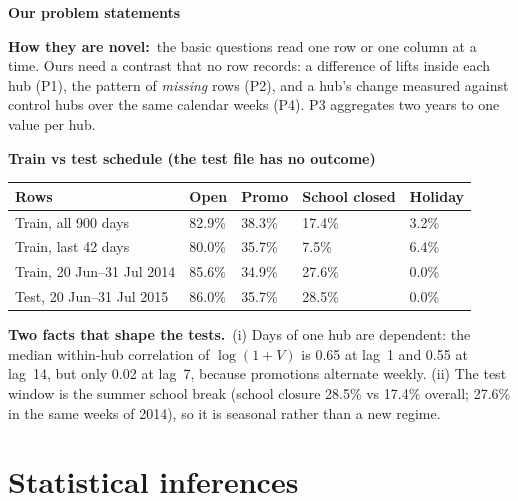 \documentclass[10pt,a4paper,twocolumn]{article}
\newcommand{\field}[2]{\textbf{#1}~#2\par}
\newcommand{\minihead}[1]{\par\needspace{8\baselineskip}\smallskip\textbf{#1}\par}
\begin{document}
\minihead{Our problem statements}
\noindent{}

\field{How they are novel:}{the basic questions read one row or one column at a time. Ours need a contrast that no
row records: a difference of lifts inside each hub (P1), the pattern of \emph{missing} rows (P2), and a hub's change
measured against control hubs over the same calendar weeks (P4). P3 aggregates two years to one value per hub.}

\minihead{Train vs test schedule (the test file has no outcome)}
{\footnotesize
\begin{tabularx}{\linewidth}{@{}Y L{1.0cm} L{1.0cm} L{1.25cm} L{1.0cm}@{}}
\toprule
\textbf{Rows} & \textbf{Open} & \textbf{Promo} & \textbf{School closed} & \textbf{Holiday} \\
\midrule
Train, all 900 days & 82.9\% & 38.3\% & 17.4\% & 3.2\% \\
Train, last 42 days & 80.0\% & 35.7\% & 7.5\% & 6.4\% \\
Train, 20 Jun--31 Jul 2014 & 85.6\% & 34.9\% & 27.6\% & 0.0\% \\
Test, 20 Jun--31 Jul 2015 & 86.0\% & 35.7\% & 28.5\% & 0.0\% \\
\bottomrule
\end{tabularx}}

\field{Two facts that shape the tests.}{(i) Days of one hub are dependent: the median within-hub correlation of
$\log(1+V)$ is 0.65 at lag~1 and 0.55 at lag~14, but only 0.02 at lag~7, because promotions alternate weekly.
(ii) The test window is the summer school break (school closure 28.5\% vs 17.4\% overall; 27.6\% in the same weeks of
2014), so it is seasonal rather than a new regime.}

\section{Statistical inferences}
\end{document}
